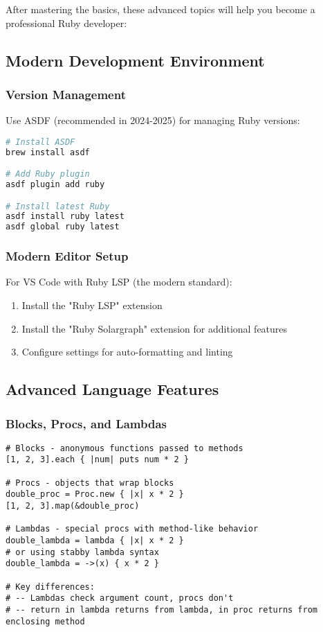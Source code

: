 \documentclass[12pt,a4paper]{article}
\begin{document}
After mastering the basics, these advanced topics will help you become a professional Ruby developer:

\subsection{Modern Development Environment}

\subsubsection{Version Management}
Use ASDF (recommended in 2024-2025) for managing Ruby versions:

\begin{lstlisting}[language=bash]
# Install ASDF
brew install asdf

# Add Ruby plugin
asdf plugin add ruby

# Install latest Ruby
asdf install ruby latest
asdf global ruby latest
\end{lstlisting}

\subsubsection{Modern Editor Setup}
For VS Code with Ruby LSP (the modern standard):

\begin{enumerate}
    \item Install the "Ruby LSP" extension
    \item Install the "Ruby Solargraph" extension for additional features
    \item Configure settings for auto-formatting and linting
\end{enumerate}

\subsection{Advanced Language Features}

\subsubsection{Blocks, Procs, and Lambdas}

\begin{lstlisting}
# Blocks - anonymous functions passed to methods
[1, 2, 3].each { |num| puts num * 2 }

# Procs - objects that wrap blocks
double_proc = Proc.new { |x| x * 2 }
[1, 2, 3].map(&double_proc)

# Lambdas - special procs with method-like behavior
double_lambda = lambda { |x| x * 2 }
# or using stabby lambda syntax
double_lambda = ->(x) { x * 2 }

# Key differences:
# -- Lambdas check argument count, procs don't
# -- return in lambda returns from lambda, in proc returns from enclosing method
\end{lstlisting}
\end{document}
